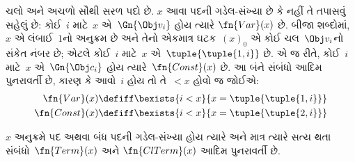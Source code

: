 ચલો અને અચળો સૌથી
સરળ પદો છે. $x$ આવા પદની ગડેલ-સંખ્યા
છે કે નહીં તે તપાસવું સહેલું છે:
કોઈ~$i$ માટે~$x$ એ~$\Gn{\Obj v_i}$
હોય ત્યારે $\fn{Var}(x)$ છે. બીજા
શબ્દોમાં, $x$ એ લંબાઈ~$1$નો અનુક્રમ છે
અને તેનો એકમાત્ર ઘટક~$(x)_0$ એ
કોઈ ચલ~$\Obj v_i$નો સંકેત
નંબર છે; એટલે કોઈ~$i$ માટે~$x$
એ~$\tuple{\tuple{1, i}}$ છે. એ જ રીતે,
કોઈ~$i$ માટે~$x$ એ~$\Gn{\Obj c_i}$
હોય ત્યારે~$\fn{Const}(x)$ છે. આ
બંને સંબંધો આદિમ પુનરાવર્તી છે, કારણ કે
આવો~$i$ હોય તો તે~$< x$ હોવો જ
જોઈએ:
\begin{align*}
  \fn{Var}(x) & \defiff \bexists{i<x}{x = \tuple{\tuple{1, i}}}\\
  \fn{Const}(x) & \defiff \bexists{i<x}{x = \tuple{\tuple{2, i}}}
\end{align*}

\begin{prop}
$x$ અનુક્રમે પદ અથવા બંધ પદની
ગડેલ-સંખ્યા હોય ત્યારે અને માત્ર ત્યારે
સત્ય થતા સંબંધો~$\fn{Term}(x)$ અને
$\fn{ClTerm}(x)$ આદિમ પુનરાવર્તી છે.
\end{prop}

